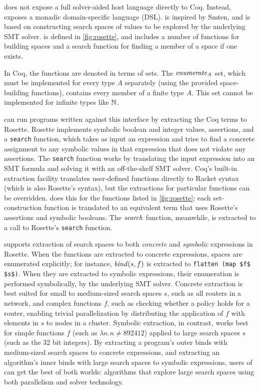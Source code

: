\SpaceSearch does not expose a full solver-aided host language directly to Coq.
Instead, \SpaceSearch exposes a monadic domain-specific language (DSL).
\SpaceSearch is
inspired by Smten, and is based on constructing search
spaces of values to be explored by the underlying SMT solver. \SpaceSearch is defined in \cref{fig:rosette}, and includes a
number of functions for building spaces and a search function for
finding a member of a space if one exists.

In Coq, the \SpaceSearch functions are denoted in terms of
sets.
The $\mathit{enumerate}_A$ set, which must
be implemented for every type $A$ separately (using the provided space-building  
functions), %
contains every member of a finite type $A$. This set  cannot be implemented
for infinite types like $\mathbb{N}$.


\SpaceSearch can run programs written against this interface by 
extracting the Coq terms to Rosette.
Rosette implements symbolic boolean and integer 
values, assertions, and a \lstinline{search} function, which takes as input an
expression and tries to find a concrete assignment to any symbolic
values in that expression that does not violate any assertions. The
\lstinline{search} function works by translating the input expression
into an SMT formula and solving it with an off-the-shelf  
SMT solver.  Coq's built-in extraction facility translates
user-defined functions directly to Racket syntax (which is also Rosette's syntax), but the extractions
for particular functions can be overridden. \SpaceSearch does this for
the functions listed in \cref{fig:rosette}; each set-construction
function is translated to an equivalent term that uses Rosette's
assertions and symbolic booleans.  The $\mathit{search}$ function, meanwhile, is extracted
to a call to Rosette's \lstinline{search} function.

\SpaceSearch supports extraction of search spaces to both \emph{concrete} and \emph{symbolic} expressions in 
Rosette. 
When
the \SpaceSearch functions are extracted to concrete expressions, spaces are
enumerated explicitly; for instance, $\mathit{bind}(s,f)$ is
extracted to \lstinline{flatten (map $f$ $s$)}.  When they are extracted to symbolic expressions, 
their enumeration is performed symbolically, by the underlying SMT solver.  
Concrete extraction is best suited for small to medium-sized search spaces $s$, such as all routers in
a network, and complex functions $f$, such as checking whether a policy holds
for a router, enabling trivial parallelization by distributing the application of $f$ with
elements in $s$ to nodes in a cluster.  Symbolic extraction, in contrast, works best for 
simple functions $f$ (such as $\lambda n. n \neq
892412$) applied to large search spaces $s$ (such
as the 32 bit integers). 
%
By extracting a program's outer binds with medium-sized search spaces to
concrete expressions, and extracting an algorithm's inner binds with large search spaces to
symbolic expressions, users of \SpaceSearch can get the best of both
worlds: algorithms that explore large search spaces using both parallelism and
solver technology.

